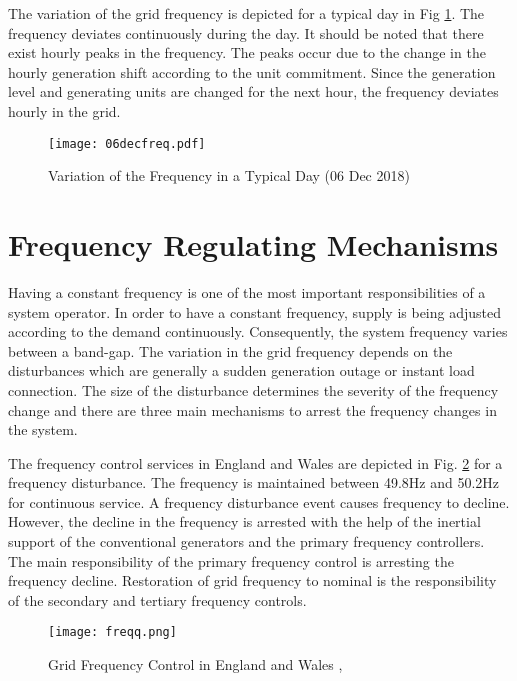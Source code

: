 The variation of the grid frequency is depicted for a typical day in Fig \ref{06decfreq}. The frequency deviates continuously during the day. It should be noted that there exist hourly peaks in the frequency. The peaks occur due to the change in the hourly generation shift according to the unit commitment. Since the generation level and generating units are changed for the next hour, the frequency deviates hourly in the grid.
\begin{figure}[h!]
	\centering
	\texttt{[image: 06decfreq.pdf]}
	\caption{Variation of the Frequency in a Typical Day (06 Dec 2018) \cite{teiasfreq}}
	\label{06decfreq}
\end{figure}
\section{Frequency Regulating Mechanisms}
Having a constant frequency is one of the most important responsibilities of a system operator. In order to have a constant frequency, supply is being adjusted according to the demand continuously. Consequently, the system frequency varies between a band-gap. The variation in the grid frequency depends on the disturbances which are generally a sudden generation outage or instant load connection. The size of the disturbance determines the severity of the frequency change and there are three main mechanisms to arrest the frequency changes in the system. \par
The frequency control services in England and Wales are depicted in Fig. \ref{freqcontrol} for a frequency disturbance. The frequency is maintained between 49.8Hz and 50.2Hz for continuous service. A frequency disturbance event causes frequency to decline. However, the decline in the frequency is arrested with the help of the inertial support of the conventional generators and the primary frequency controllers. The main responsibility of the primary frequency control is arresting the frequency decline. Restoration of grid frequency to nominal is the responsibility of the secondary and tertiary frequency controls.
\begin{figure}[h!]
	\centering
	\texttt{[image: freqq.png]}
	\caption{Grid Frequency Control in England and Wales \cite{Ekanayake2008}, \cite{Erinmez1999}}
	\label{freqcontrol}
\end{figure}
